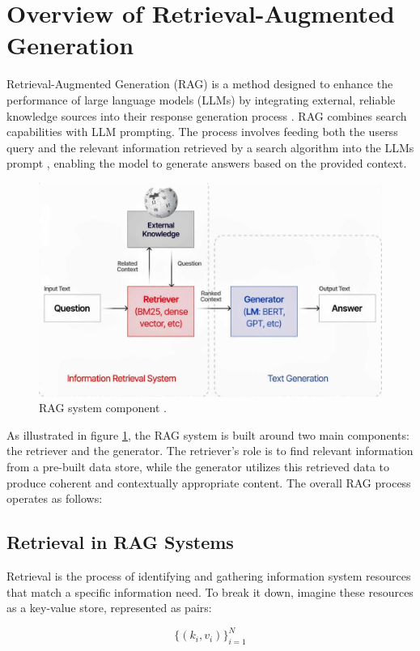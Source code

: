 \documentclass[Afour,sageh,times]{sagej}
\begin{document}
\section{Overview of Retrieval-Augmented Generation }\label{sec3}
Retrieval-Augmented Generation (RAG) is a method designed to enhance the performance of large language models (LLMs) by integrating external, reliable knowledge sources into their response generation process \cite{awsRAG}. RAG combines search capabilities with LLM prompting. The process involves feeding both the userss query and the relevant information retrieved by a search algorithm into the LLMs prompt \cite{ilin2023advancedrag}, enabling the model to generate answers based on the provided context.
\begin{figure}[h]
	\centering
	\includegraphics[width=0.9\linewidth]{rag.JPG}
	\caption{RAG system component \cite{gupta20241}. }\label{rag.PNG}
\end{figure}
As illustrated in figure \ref{rag.PNG}, the RAG system is built around two main components: the retriever and the generator. The retriever's role is to find relevant information from a pre-built data store, while the generator utilizes this retrieved data to produce coherent and contextually appropriate content. The overall RAG process operates as follows:
\subsection{Retrieval in RAG Systems}\label{subsec2}

Retrieval is the process of identifying and gathering information system resources that match a specific information need. To break it down, imagine these resources as a key-value store, represented as pairs:

\begin{equation}
\{(k_i, v_i)\}_{i=1}^{N}
\end{equation}
\end{document}
